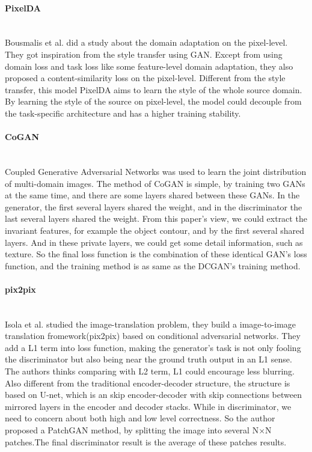 \documentclass{kththesis}
\begin{document}
\paragraph{PixelDA}~{}\\


\noindent Bousmalis et al.\cite{bousmalis2016unsupervised} did a study about the domain adaptation on the pixel-level. They got inspiration from the style transfer \cite{gatys2016image,johnson2016perceptual} using GAN. Except from using domain loss and task loss like some feature-level domain adaptation\cite{ganin2015unsupervised,ganin2016domain,tzeng2017adversarial}, they also proposed a content-similarity loss on the pixel-level. Different from the style transfer, this model PixelDA aims to learn the style of the whole source domain. By learning the style of the source on pixel-level, the model could decouple from the task-specific architecture and has a higher training stability. 

\paragraph{CoGAN}~{}\\

\noindent Coupled Generative Adversarial Networks\cite{liu2016coupled} was used to learn the joint distribution of multi-domain images. The method of CoGAN is simple, by training two GANs at the same time, and there are some layers shared between these GANs. In the generator, the first several layers shared the weight, and in the discriminator the last several layers shared the weight. From this paper's view, we could extract the invariant features, for example the object contour, and by the first several shared layers. And in these private layers, we could get some detail information, such as texture. So the final loss function is the combination of these identical GAN's loss function, and the training method is as same as the DCGAN's \cite{radford2015unsupervised} training method. 

\paragraph{pix2pix}~{}\\

\noindent Isola et al.\cite{isola2016image} studied the image-translation problem, they build a image-to-image translation fromework(pix2pix) based on conditional adversarial networks\cite{mirza2014conditional}. They add a L1 term into loss function, making the generator's task is not only fooling the discriminator but also being near the ground truth output in an L1 sense. The authors thinks comparing with L2 term, L1 could encourage less blurring. Also different from the traditional encoder-decoder structure, the structure is based on U-net\cite{ronneberger2015u}, which is an skip encoder-decoder with skip connections between mirrored layers in the encoder and decoder stacks. While in discriminator, we need to concern about both high and low level correctness. So the author proposed a PatchGAN method, by splitting the image into several N$\times$N patches.The final discriminator result is the average of these patches results. 
\end{document}
